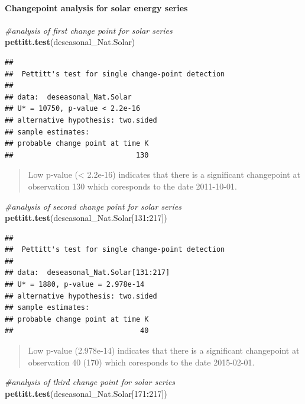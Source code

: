 \documentclass[12pt,]{article}
\newenvironment{Shaded}{\begin{snugshade}}{\end{snugshade}}
\newcommand{\KeywordTok}[1]{\textcolor[rgb]{0.13,0.29,0.53}{\textbf{#1}}}
\newcommand{\DecValTok}[1]{\textcolor[rgb]{0.00,0.00,0.81}{#1}}
\newcommand{\CommentTok}[1]{\textcolor[rgb]{0.56,0.35,0.01}{\textit{#1}}}
\newcommand{\OperatorTok}[1]{\textcolor[rgb]{0.81,0.36,0.00}{\textbf{#1}}}
\newcommand{\NormalTok}[1]{#1}
\let\oldparagraph\paragraph
\renewcommand{\paragraph}[1]{\oldparagraph{#1}\mbox{}}
\begin{document}
\paragraph{Changepoint analysis for solar energy
series}\label{changepoint-analysis-for-solar-energy-series}

\begin{Shaded}
\begin{Highlighting}[]
\CommentTok{#analysis of first change point for solar series}
\KeywordTok{pettitt.test}\NormalTok{(deseasonal_Nat.Solar)}
\end{Highlighting}
\end{Shaded}

\begin{verbatim}
## 
##  Pettitt's test for single change-point detection
## 
## data:  deseasonal_Nat.Solar
## U* = 10750, p-value < 2.2e-16
## alternative hypothesis: two.sided
## sample estimates:
## probable change point at time K 
##                             130
\end{verbatim}

\begin{quote}
Low p-value (\textless{} 2.2e-16) indicates that there is a significant
changepoint at observation 130 which coresponds to the date 2011-10-01.
\end{quote}

\begin{Shaded}
\begin{Highlighting}[]
\CommentTok{#analysis of second change point for solar series}
\KeywordTok{pettitt.test}\NormalTok{(deseasonal_Nat.Solar[}\DecValTok{131}\OperatorTok{:}\DecValTok{217}\NormalTok{])}
\end{Highlighting}
\end{Shaded}

\begin{verbatim}
## 
##  Pettitt's test for single change-point detection
## 
## data:  deseasonal_Nat.Solar[131:217]
## U* = 1880, p-value = 2.978e-14
## alternative hypothesis: two.sided
## sample estimates:
## probable change point at time K 
##                              40
\end{verbatim}

\begin{quote}
Low p-value (2.978e-14) indicates that there is a significant
changepoint at observation 40 (170) which coresponds to the date
2015-02-01.
\end{quote}

\begin{Shaded}
\begin{Highlighting}[]
\CommentTok{#analysis of third change point for solar series}
\KeywordTok{pettitt.test}\NormalTok{(deseasonal_Nat.Solar[}\DecValTok{171}\OperatorTok{:}\DecValTok{217}\NormalTok{])}
\end{Highlighting}
\end{Shaded}
\end{document}
